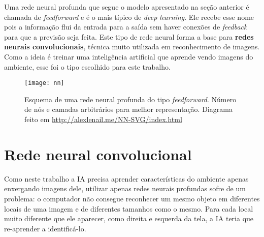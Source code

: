 Uma rede neural profunda que segue o modelo apresentado na seção anterior é chamada de \textit{feedforward} e é o mais típico de \textit{deep learning}.
Ele recebe esse nome pois a informação flui da entrada para a saída sem haver conexões de \textit{feedback} para que a previsão seja feita.
Este tipo de rede neural forma a base para \textbf{redes neurais convolucionais}, técnica muito utilizada em reconhecimento de imagens.
Como a ideia é treinar uma inteligência artificial que aprende vendo imagens do ambiente, esse foi o tipo escolhido para este trabalho.

\begin{figure}[h!]
\texttt{[image: nn]}
\centering
\caption{Esquema de uma rede neural profunda do tipo \textit{feedforward}. Número de nós e camadas arbitrários para melhor representação. Diagrama feito em \url{http://alexlenail.me/NN-SVG/index.html}}
\end{figure}


\section{Rede neural convolucional}
\label{sec:cnn}

Como neste trabalho a IA precisa aprender características do ambiente apenas enxergando imagens dele, utilizar apenas redes neurais profundas sofre de um problema:
o computador não consegue reconhecer um mesmo objeto em diferentes locais de uma imagem e de diferentes tamanhos como o mesmo.
Para cada local muito diferente que ele aparecer, como direita e esquerda da tela, a IA teria que re-aprender a identificá-lo.

